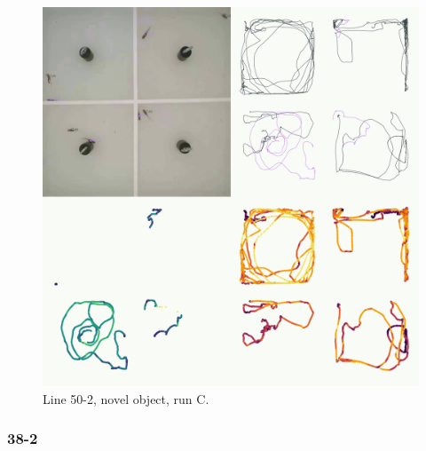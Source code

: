 \documentclass[
]{book}
\begin{document}
\begin{figure}
\includegraphics[width=1\linewidth]{figs/mikk_behaviour/four_panel_plots/novel_object_20191120_1150_50-2_R_C_300} \caption{Line 50-2, novel object, run C.}\label{fig:4p-50-2-no-C}
\end{figure}

\hypertarget{section-10}{%
\subsubsection{38-2}\label{section-10}}
\end{document}
